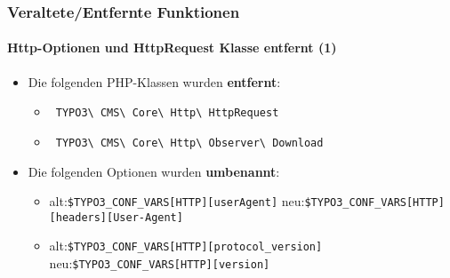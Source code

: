 \begin{frame}[fragile]
	\frametitle{Veraltete/Entfernte Funktionen}
	\framesubtitle{Http-Optionen und HttpRequest Klasse entfernt (1)}

	\begin{itemize}

		\item Die folgenden PHP-Klassen wurden \textbf{entfernt}:
			\begin{itemize}
				\item \small\texttt{
					TYPO3\textbackslash
					CMS\textbackslash
					Core\textbackslash
					Http\textbackslash
					HttpRequest}\normalsize
				\item \small\texttt{
					TYPO3\textbackslash
					CMS\textbackslash
					Core\textbackslash
					Http\textbackslash
					Observer\textbackslash
					Download}\normalsize
			\end{itemize}

		\item Die folgenden Optionen wurden \textbf{umbenannt}:

			\begin{itemize}

				\item
					\small
						alt:\tabto{1cm}\texttt{\$TYPO3\_CONF\_VARS[HTTP][userAgent]}\newline
						neu:\tabto{1cm}\texttt{\$TYPO3\_CONF\_VARS[HTTP][headers][User-Agent]}

				\item
					\small
						alt:\tabto{1cm}\texttt{\$TYPO3\_CONF\_VARS[HTTP][protocol\_version]}\newline
						neu:\tabto{1cm}\texttt{\$TYPO3\_CONF\_VARS[HTTP][version]}

			\end{itemize}

	\end{itemize}

\end{frame}
